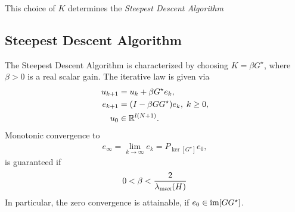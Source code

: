 This choice of $K$ determines the \textit{Steepest Descent Algorithm}

\subsection{Steepest Descent Algorithm}
\begin{alg}
	\label{alg:SDA}
	The Steepest Descent Algorithm is characterized by choosing $K = \beta G^\star$, where $\beta>0$ is a real scalar gain. The iterative law is given via 
	\begin{align}
	\label{eq:errSDA}
	\begin{split}
	u_{k+1} &= u_k + \beta G^\star e_k,\\
	e_{k+1} &= (I- \beta G G^\star) e_{k}, \; k\geq 0,\\
	u_0 &\in {\mathbb{R}}^{l (N+1)}. 
	\end{split}
	\end{align}
	Monotonic convergence to 
	\begin{align}
	\label{eq:SDAErrLim} 
	e_\infty  = \lim_{k\to\infty} e_k = P_{\ker[G^\star]}e_0,
	\end{align} 
	is guaranteed if
	\begin{align*}
	0 <\beta < \frac{2}{\lambda_{\mathrm{max}}(H)}
	\end{align*}
	In particular, the zero convergence is attainable, if $e_0 \in \operatorname{im} [G G^\star]$. 
\end{alg} 
